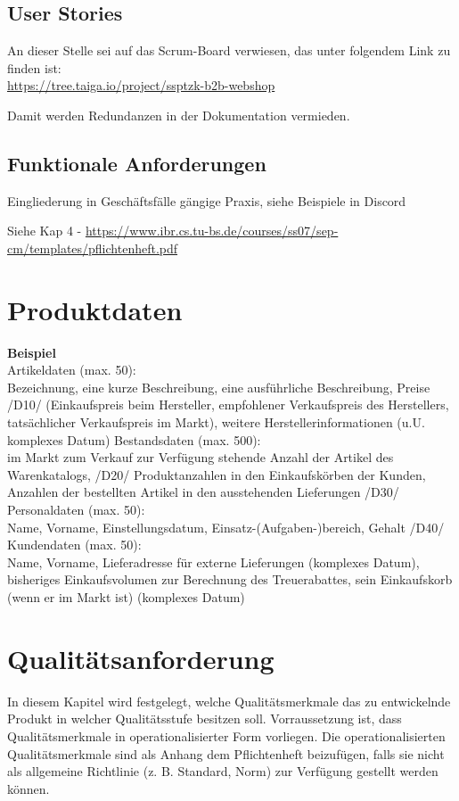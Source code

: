 \documentclass[%
	12pt,
	a4paper,
	oneside,
	parskip=full
]{scrbook}
\begin{document}
\section{User Stories}
An dieser Stelle sei auf das Scrum-Board verwiesen, das unter folgendem Link zu finden ist: \\
\url{https://tree.taiga.io/project/ssptzk-b2b-webshop}

Damit werden Redundanzen in der Dokumentation vermieden.

\section{Funktionale Anforderungen}
Eingliederung in Geschäftsfälle gängige Praxis, siehe Beispiele in Discord

Siehe Kap 4 - \url{https://www.ibr.cs.tu-bs.de/courses/ss07/sep-cm/templates/pflichtenheft.pdf}


\chapter{Produktdaten}
\textbf{Beispiel} \\
Artikeldaten (max. 50):\\
Bezeichnung, eine kurze Beschreibung, eine ausführliche Beschreibung, Preise
/D10/
(Einkaufspreis beim Hersteller, empfohlener Verkaufspreis des Herstellers,
tatsächlicher Verkaufspreis im Markt), weitere Herstellerinformationen (u.U.
komplexes Datum)
Bestandsdaten (max. 500):\\
im Markt zum Verkauf zur Verfügung stehende Anzahl der Artikel des Warenkatalogs,
/D20/
Produktanzahlen in den Einkaufskörben der Kunden, Anzahlen der bestellten Artikel in
den ausstehenden Lieferungen
/D30/ Personaldaten (max. 50):\\
Name, Vorname, Einstellungsdatum, Einsatz-(Aufgaben-)bereich, Gehalt
/D40/ Kundendaten (max. 50):\\
Name, Vorname, Lieferadresse für externe Lieferungen (komplexes Datum), bisheriges
Einkaufsvolumen zur Berechnung des Treuerabattes, sein Einkaufskorb (wenn er im
Markt ist) (komplexes Datum)

\chapter{Qualitätsanforderung}
In diesem Kapitel wird festgelegt, welche Qualitätsmerkmale das zu entwickelnde Produkt in
welcher Qualitätsstufe besitzen soll. Vorraussetzung ist, dass Qualitätsmerkmale in
operationalisierter Form vorliegen. Die operationalisierten Qualitätsmerkmale sind als
Anhang dem Pflichtenheft beizufügen, falls sie nicht als allgemeine Richtlinie (z. B. Standard,
Norm) zur Verfügung gestellt werden können.
\end{document}
